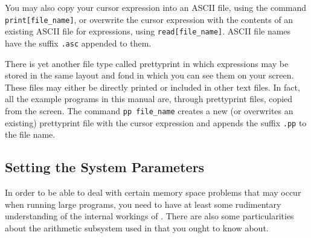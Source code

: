You may also copy your cursor expression into an {\mys ASCII file}, using the
command {\tt print[file\_name]}, or overwrite the cursor expression with
the contents of an existing ASCII file for \kir expressions, using
{\tt read[file\_name]}. ASCII file names have the suffix {\tt .asc}
appended to them.

There is yet another file type called {\mys prettyprint} in  which 
\kir expressions may be stored in the same layout and fond in which
you can see them on your screen. These files may either be directly
printed or included in other text files. In fact, all the example programs  
in this manual are, through prettyprint files, copied from the 
screen.  The command {\tt pp file\_name} creates a new (or overwrites
an existing) prettyprint file with the cursor expression and appends the
suffix {\tt .pp} to the file name.

\subsection{Setting the System Parameters}

In order to be able to deal with certain {\mys memory space problems}
that may occur when running large programs, you need to have at least 
some rudimentary understanding of the internal workings of \pired.
There are also some particularities about the {\mys arithmetic subsystem} 
 used in \pired that you ought to know about. 

